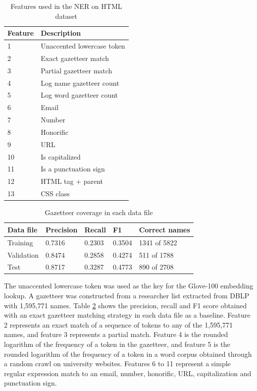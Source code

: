 \documentclass{nle}
\begin{document}
\begin{table}[h]
  \small
  \begin{center}
    \begin{tabular}{ ll }
      \toprule
      Feature & Description \\
      \midrule
      1  & Unaccented lowercase token \\
      2  & Exact gazetteer match \\
      3  & Partial gazetteer match \\
      4  & Log name gazetteer count\\
      5  & Log word gazetteer count\\
      6  & Email \\
      7  & Number \\
      8  & Honorific \\
      9  & URL \\
      10 & Is capitalized \\
      11 & Is a punctuation sign \\
      12 & HTML tag + parent \\
      13 & CSS class \\
      \bottomrule
    \end{tabular}
  \end{center}
  \caption{Features used in the NER on HTML dataset}
  \label{tab:features}
\end{table}

\begin{table}[h]
  \small
  \begin{center}
    \begin{tabular}{ lllll }
      \toprule
      Data file & Precision & Recall & F1 & Correct names \\
      \midrule
      Training   & 0.7316 & 0.2303 & 0.3504 & 1341 of 5822 \\ 
      Validation & 0.8474 & 0.2858 & 0.4274 & 511 of 1788 \\ 
      Test       & 0.8717 & 0.3287 & 0.4773 & 890 of 2708 \\ 
      \bottomrule
    \end{tabular}
  \end{center}
  \caption{Gazetteer coverage in each data file}
  \label{tab:gazetteer}
\end{table}

The unaccented lowercase token was used as the key for the Glove-100 embedding lookup.
A gazetteer was constructed from a researcher list extracted from DBLP with 1,595,771
names. Table \ref{tab:gazetteer} shows the precision, recall and F1 score obtained with an
exact gazetteer matching strategy in each data file as a baseline.
Feature 2 represents an exact match of a sequence of tokens to any of the 1,595,771 
names, and feature 3 represents a partial match. Feature 4 is the rounded logarithm of 
the frequency of a token in the gazetteer, and feature 5 is the rounded logarithm of the frequency
of a token in a word corpus obtained through a random crawl on university websites.
Features 6 to 11 represent a simple regular expression match to an email, number, 
honorific, URL, capitalization and punctuation sign.
\end{document}

